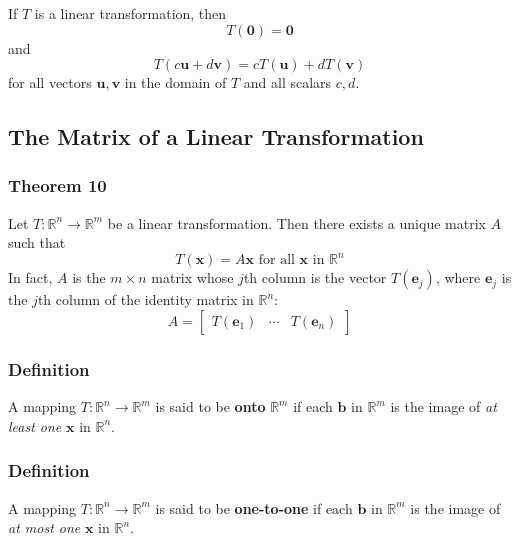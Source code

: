 \documentclass[letterpaper,11pt]{article}
\begin{document}
			\subsubsection{}	
				If $T$ is a linear transformation, then
				\begin{equation}
					T(\mathbf{0})=\mathbf{0}
				\end{equation}
				and
				\begin{equation}
					T(c\mathbf{u}+d\mathbf{v})=cT(\mathbf{u})+dT(\mathbf{v})
				\end{equation}
				for all vectors $\mathbf{u,v}$ in the domain of $T$ and all scalars $c,d$.
		\subsection{The Matrix of a Linear Transformation}
			\subsubsection{Theorem 10}
				Let $T:\mathbb{R}^n\rightarrow\mathbb{R}^m$ be a linear transformation. Then there exists a unique matrix $A$ such that
				\begin{equation}
					T(\mathbf{x})=A\mathbf{x}\textrm{ for all }\mathbf{x}\textrm{ in }\mathbb{R}^n
				\end{equation}
				In fact, $A$ is the $m\times n$ matrix whose $j$th column is the vector $T(\mathbf{e}_j)$, where $\mathbf{e}_j$ is the $j$th column of the identity matrix in $\mathbb{R}^n$:
				\begin{equation}
					A=
					\begin{bmatrix}
						T(\mathbf{e}_1) & \cdots & T(\mathbf{e}_n)
					\end{bmatrix}
				\end{equation}
			\subsubsection{Definition}
				A mapping $T:\mathbb{R}^n\rightarrow\mathbb{R}^m$ is said to be \textbf{onto} $\mathbb{R}^m$ if each $\mathbf{b}$ in $\mathbb{R}^m$ is the image of \textit{at least one} $\mathbf{x}$ in $\mathbb{R}^n$.
			\subsubsection{Definition}
				A mapping $T:\mathbb{R}^n\rightarrow\mathbb{R}^m$ is said to be \textbf{one-to-one} if each $\mathbf{b}$ in $\mathbb{R}^m$ is the image of \textit{at most one} $\mathbf{x}$ in $\mathbb{R}^n$.
\end{document}
